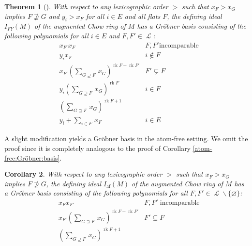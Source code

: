 \documentclass[11pt, reqno]{amsart}
\DeclareMathOperator{\atomfree}{af}
\newcommand{\af}{{\atomfree}}
\renewcommand{\emptyset}{\varnothing}
\DeclareMathOperator{\LL}{\mathcal{L}}
\DeclareMathOperator{\rk}{rk}
\renewcommand{\setminus}{\smallsetminus}
\newtheorem{thm}{Theorem}[section]
\newtheorem{cor}[thm]{Corollary}
\theoremstyle{definition}
\numberwithin{equation}{section}
\numberwithin{table}{section}
\begin{document}
\begin{spacing}{1.1}
\begin{thm}[{\cite[Theorem 2]{FY04}}]
With respect to any lexicographic order $>$ such that $x_F > x_G$ implies $F \nsupseteq G$ and $y_i > x_F$ for all $i \in E$ and all flats $F$, the defining ideal $I_{FY}(M)$ of the augmented Chow ring of $M$ has a Gr\"obner basis consisting of the following polynomials for all $i \in E$ and $F, F' \in \LL$:
\begin{align} 
&x_{F'}x_F & F, F' \text{incomparable} \\
& y_ix_F & i \notin F \\
&x_{F'}(\textstyle \sum_{G \supseteq F}\, x_G)^{\rk F - \rk F'}& F' \subsetneq F \\
&y_i(\textstyle \sum_{G \supseteq F} \, x_G)^{\rk F}& i \in F \\
&(\textstyle \sum_{G \supseteq F} \, x_G)^{\rk F + 1}
\\
& \textstyle y_i + \sum_{i \in F} \, x_F & i \in E
\end{align}
\end{thm}

A slight modification yields a Gr\"obner basis in the atom-free setting.  We omit the proof since it is completely analogous to the proof of Corollary \ref{atom-free:Gröbner:basis}.

\begin{cor} \label{augmented:atom-free:Gröbner:basis}
With respect to any lexicographic order $>$ such that $x_F > x_G$ implies $F \nsupseteq G$, the defining ideal $I_\af(M)$ of the augmented Chow ring of $M$ has a Gr\"obner basis consisting of the following polynomials for all $F, F' \in \LL \setminus \{\emptyset\}$:
\begin{align} 
&x_Fx_{F'}& F, F' \; \text{incomparable} \\
&x_{F'}(\textstyle \sum_{G \supseteq F} \, x_G)^{\rk F - \rk F'}& F' \subsetneq F \\
&(\textstyle \sum_{G \supseteq F} \, x_G)^{\rk F + 1} &
\end{align}
\end{cor}


\end{spacing}
\end{document}
